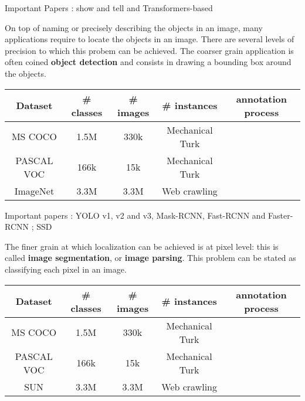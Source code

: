 Important Papers : show and tell \cite{xu2015show} and Transformers-based \cite{sharma-etal-2018-conceptual}


On top of naming or precisely describing the objects in an image, many applications require to locate the objects in an image. There are several levels of precision to which this probem can be achieved. The coarser grain application is often coined \textbf{object detection} and consists in drawing a bounding box around the objects.

\vspace{0.5cm}

\begin{center}
	\begin{tabular}{|c|c|c|c|c|}
		\hline
		Dataset & \# classes & \# images & \# instances & annotation process \\
		\hline
		MS COCO \cite{chen2015microsoft} & 1.5M & 330k & Mechanical Turk \\
		PASCAL VOC \cite{} & 166k & 15k & Mechanical Turk \\
		ImageNet\cite{} & 3.3M & 3.3M & Web crawling \\
		\hline
	\end{tabular}
\end{center}
\vspace{0.5cm}

Important papers : YOLO v1, v2 and v3, Mask-RCNN, Fast-RCNN and Faster-RCNN ; SSD

The finer grain at which localization can be achieved is at pixel level: this is called \textbf{image segmentation}, or \textbf{image parsing}. This problem can be stated as classifying each pixel in an image.

\vspace{0.5cm}

\begin{center}
	\begin{tabular}{|c|c|c|c|c|}
		\hline
		Dataset & \# classes & \# images & \# instances & annotation process \\
		\hline
		MS COCO \cite{chen2015microsoft} & 1.5M & 330k & Mechanical Turk \\
		PASCAL VOC \cite{} & 166k & 15k & Mechanical Turk \\
		SUN \cite{} & 3.3M & 3.3M & Web crawling \\
		\hline
	\end{tabular}
\end{center}
\vspace{0.5cm}

